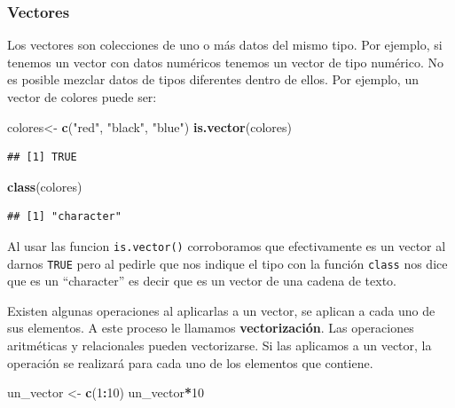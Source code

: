 \documentclass[
]{book}
\newenvironment{Shaded}{\begin{snugshade}}{\end{snugshade}}
\newcommand{\DecValTok}[1]{\textcolor[rgb]{0.00,0.00,0.81}{#1}}
\newcommand{\FunctionTok}[1]{\textcolor[rgb]{0.13,0.29,0.53}{\textbf{#1}}}
\newcommand{\NormalTok}[1]{#1}
\newcommand{\OtherTok}[1]{\textcolor[rgb]{0.56,0.35,0.01}{#1}}
\newcommand{\SpecialCharTok}[1]{\textcolor[rgb]{0.81,0.36,0.00}{\textbf{#1}}}
\newcommand{\StringTok}[1]{\textcolor[rgb]{0.31,0.60,0.02}{#1}}
\begin{document}
\subsubsection{Vectores}\label{vectores}

Los vectores son colecciones de uno o más datos del mismo tipo.
Por ejemplo, si tenemos un vector con datos numéricos tenemos un vector de tipo numérico.
No es posible mezclar datos de tipos diferentes dentro de ellos.
Por ejemplo, un vector de colores puede ser:

\begin{Shaded}
\begin{Highlighting}[]
\NormalTok{colores}\OtherTok{\textless{}{-}} \FunctionTok{c}\NormalTok{(}\StringTok{"red"}\NormalTok{, }\StringTok{"black"}\NormalTok{, }\StringTok{"blue"}\NormalTok{)}
\FunctionTok{is.vector}\NormalTok{(colores)}
\end{Highlighting}
\end{Shaded}

\begin{verbatim}
## [1] TRUE
\end{verbatim}

\begin{Shaded}
\begin{Highlighting}[]
\FunctionTok{class}\NormalTok{(colores)}
\end{Highlighting}
\end{Shaded}

\begin{verbatim}
## [1] "character"
\end{verbatim}

Al usar las funcion \texttt{is.vector()} corroboramos que efectivamente es un vector al darnos \texttt{TRUE} pero al pedirle que nos indique el tipo con la función \texttt{class} nos dice que es un ``character'' es decir que es un vector de una cadena de texto.

Existen algunas operaciones al aplicarlas a un vector, se aplican a cada uno de sus elementos.
A este proceso le llamamos \textbf{vectorización}.
Las operaciones aritméticas y relacionales pueden vectorizarse.
Si las aplicamos a un vector, la operación se realizará para cada uno de los elementos que contiene.

\begin{Shaded}
\begin{Highlighting}[]
\NormalTok{un\_vector }\OtherTok{\textless{}{-}} \FunctionTok{c}\NormalTok{(}\DecValTok{1}\SpecialCharTok{:}\DecValTok{10}\NormalTok{)}
\NormalTok{un\_vector}\SpecialCharTok{*}\DecValTok{10}
\end{Highlighting}
\end{Shaded}
\end{document}
